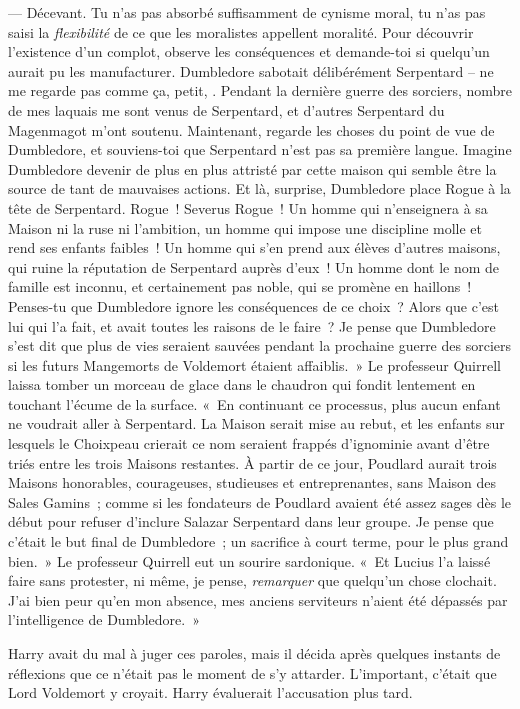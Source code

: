 --- Décevant. Tu n'as pas absorbé suffisamment de cynisme moral, tu n'as pas saisi la \emph{flexibilité} de ce que les moralistes appellent moralité. Pour découvrir l'existence d'un complot, observe les conséquences et demande-toi si quelqu'un aurait pu les manufacturer. Dumbledore sabotait délibérément Serpentard -- ne me regarde pas comme ça, petit, . Pendant la dernière guerre des sorciers, nombre de mes laquais me sont venus de Serpentard, et d'autres Serpentard du Magenmagot m'ont soutenu. Maintenant, regarde les choses du point de vue de Dumbledore, et souviens-toi que Serpentard n'est pas sa première langue. Imagine Dumbledore devenir de plus en plus attristé par cette maison qui semble être la source de tant de mauvaises actions. Et là, surprise, Dumbledore place Rogue à la tête de Serpentard. Rogue~! Severus Rogue~! Un homme qui n'enseignera à sa Maison ni la ruse ni l'ambition, un homme qui impose une discipline molle et rend ses enfants faibles~! Un homme qui s'en prend aux élèves d'autres maisons, qui ruine la réputation de Serpentard auprès d'eux~! Un homme dont le nom de famille est inconnu, et certainement pas noble, qui se promène en haillons~! Penses-tu que Dumbledore ignore les conséquences de ce choix~? Alors que c'est lui qui l'a fait, et avait toutes les raisons de le faire~? Je pense que Dumbledore s'est dit que plus de vies seraient sauvées pendant la prochaine guerre des sorciers si les futurs Mangemorts de Voldemort étaient affaiblis.~» Le professeur Quirrell laissa tomber un morceau de glace dans le chaudron qui fondit lentement en touchant l'écume de la surface. «~En continuant ce processus, plus aucun enfant ne voudrait aller à Serpentard. La Maison serait mise au rebut, et les enfants sur lesquels le Choixpeau crierait ce nom seraient frappés d'ignominie avant d'être triés entre les trois Maisons restantes. À partir de ce jour, Poudlard aurait trois Maisons honorables, courageuses, studieuses et entreprenantes, sans Maison des Sales Gamins~; comme si les fondateurs de Poudlard avaient été assez sages dès le début pour refuser d'inclure Salazar Serpentard dans leur groupe. Je pense que c'était le but final de Dumbledore~; un sacrifice à court terme, pour le plus grand bien.~» Le professeur Quirrell eut un sourire sardonique. «~Et Lucius l'a laissé faire sans protester, ni même, je pense, \emph{remarquer} que quelqu'un chose clochait. J'ai bien peur qu'en mon absence, mes anciens serviteurs n'aient été dépassés par l'intelligence de Dumbledore.~»

Harry avait du mal à juger ces paroles, mais il décida après quelques instants de réflexions que ce n'était pas le moment de s'y attarder. L'important, c'était que Lord Voldemort y croyait. Harry évaluerait l'accusation plus tard.

